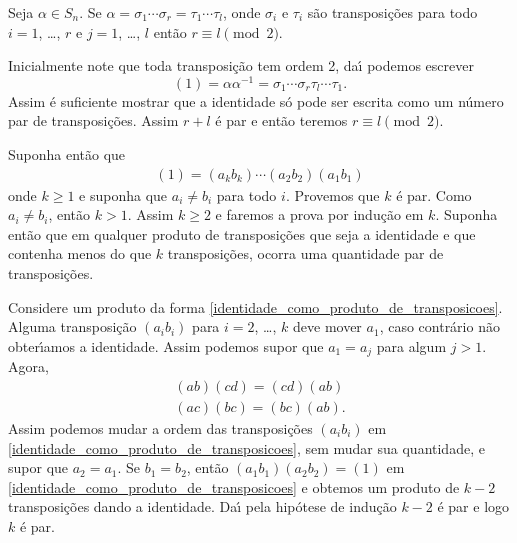 \begin{teorema}
	Seja $\alpha \in S_n$. Se $\alpha = \sigma_1 \cdots \sigma_r = \tau_1 \cdots \tau_l$, onde $\sigma_i$ e $\tau_i$ s\~ao transposi\c{c}\~oes para todo $i = 1$, \dots, $r$ e $j = 1$, \dots, $l$ ent\~ao $r \equiv l \pmod 2$.
\end{teorema}
\begin{prova}
	Inicialmente note que toda transposi\c{c}\~ao tem ordem 2, da{\'\i} podemos escrever
	\[
		(1) = \alpha\alpha^{-1} = \sigma_1\cdots\sigma_r\tau_l\cdots\tau_1.
	\]
	Assim \'e suficiente mostrar que a identidade s\'o pode ser escrita como um n\'umero par de transposi\c{c}\~oes. Assim $r + l$ \'e par e ent\~ao teremos $r \equiv l \pmod 2$.

	Suponha ent\~ao que
	\begin{align}\label{identidade_como_produto_de_transposicoes}
		(1) = (a_k b_k)\cdots (a_2 b_2)(a_1 b_1)
	\end{align}
	onde $k \ge 1$ e suponha que $a_i \ne b_i$ para todo $i$. Provemos que $k$ \'e par. Como $a_i \ne b_i$, ent\~ao $k > 1$. Assim $k \ge 2$ e faremos a prova por indu\c{c}\~ao em $k$. Suponha ent\~ao que em qualquer produto de transposi\c{c}\~oes que seja a identidade e que contenha menos do que $k$ transposi\c{c}\~oes, ocorra uma quantidade par de transposi\c{c}\~oes.

	Considere um produto da forma \eqref{identidade_como_produto_de_transposicoes}. Alguma transposi\c{c}\~ao $(a_i b_i)$ para $i = 2$, \dots, $k$ deve mover $a_1$, caso contr\'ario n\~ao obter{\'\i}amos a identidade. Assim podemos supor que $a_1 = a_j$ para algum $j > 1$. Agora,
	\begin{align*}
		(ab)(cd) = (cd)(ab)\\
		(ac)(bc) = (bc)(ab).
	\end{align*}
	Assim podemos mudar a ordem das transposi\c{c}\~oes $(a_i b_i)$ em \eqref{identidade_como_produto_de_transposicoes}, sem mudar sua quantidade, e supor que $a_2 = a_1$. Se $b_1 = b_2$, ent\~ao $(a_1 b_1)(a_2 b_2) = (1)$ em \eqref{identidade_como_produto_de_transposicoes} e obtemos um produto de $k - 2$ transposi\c{c}\~oes dando a identidade. Da{\'\i} pela hip\'otese de indu\c{c}\~ao $k - 2$ \'e par e logo $k$ \'e par.


\end{prova}
